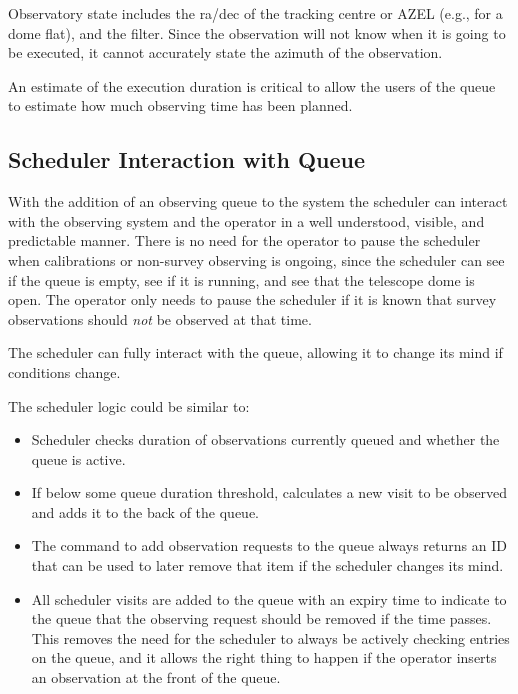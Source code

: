 \documentclass[TS,toc,lsstdraft]{lsstdoc}
\begin{document}
Observatory state includes the ra/dec of the tracking centre or AZEL (e.g., for a dome flat), and the filter.
Since the observation will not know when it is going to be executed, it cannot accurately state the azimuth of the observation.

An estimate of the execution duration is critical to allow the users of the queue to estimate how much observing time has been planned.

\subsection{Scheduler Interaction with Queue}

With the addition of an observing queue to the system the scheduler can interact with the observing system and the operator in a well understood, visible, and predictable manner.
There is no need for the operator to pause the scheduler when calibrations or non-survey observing is ongoing, since the scheduler can see if the queue is empty, see if it is running, and see that the telescope dome is open.
The operator only needs to pause the scheduler if it is known that survey observations should \emph{not} be observed at that time.

The scheduler can fully interact with the queue, allowing it to change its mind if conditions change.

The scheduler logic could be similar to:

\begin{itemize}

\item Scheduler checks duration of observations currently queued and whether the queue is active.

\item If below some queue duration threshold, calculates a new visit to be observed and adds it to the back of the queue.

\item The command to add observation requests to the queue always returns an ID that can be used to later remove that item if the scheduler changes its mind.

\item All scheduler visits are added to the queue with an expiry time to indicate to the queue that the observing request should be removed if the time passes.
This removes the need for the scheduler to always be actively checking entries on the queue, and it allows the right thing to happen if the operator inserts an observation at the front of the queue.

\end{itemize}
\end{document}
